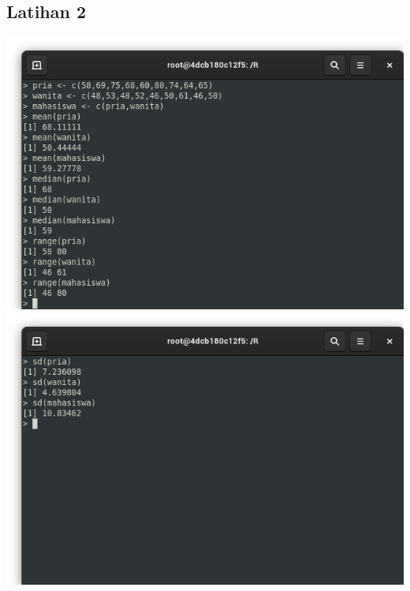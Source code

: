 \documentclass[a4paper,12pt]{article}
\begin{document}
\subsection{Latihan 2}
\includegraphics[width=\linewidth]{latihan02-1}
\includegraphics[width=\linewidth]{latihan02-2}
\end{document}
